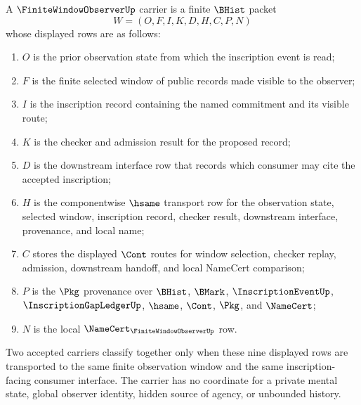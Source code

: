 \begin{definition}
\label{def:finite-window-observer-carrier}
A $\FiniteWindowObserverUp$ carrier is a finite $\BHist$ packet
$$
W=(O,F,I,K,D,H,C,P,N)
$$
whose displayed rows are as follows:
\begin{enumerate}
\item $O$ is the prior observation state from which the inscription event is read;
\item $F$ is the finite selected window of public records made visible to the observer;
\item $I$ is the inscription record containing the named commitment and its visible route;
\item $K$ is the checker and admission result for the proposed record;
\item $D$ is the downstream interface row that records which consumer may cite the accepted inscription;
\item $H$ is the componentwise $\hsame$ transport row for the observation state, selected window, inscription record, checker result, downstream interface, provenance, and local name;
\item $C$ stores the displayed $\Cont$ routes for window selection, checker replay, admission, downstream handoff, and local NameCert comparison;
\item $P$ is the $\Pkg$ provenance over $\BHist$, $\BMark$, $\InscriptionEventUp$, $\InscriptionGapLedgerUp$, $\hsame$, $\Cont$, $\Pkg$, and $\NameCert$;
\item $N$ is the local $\NameCert_{\FiniteWindowObserverUp}$ row.
\end{enumerate}
Two accepted carriers classify together only when these nine displayed rows are transported to the same finite observation window and the same inscription-facing consumer interface. The carrier has no coordinate for a private mental state, global observer identity, hidden source of agency, or unbounded history.
\end{definition}

